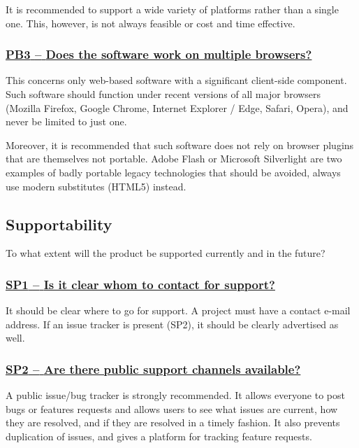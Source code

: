 \documentclass[a4paper,11pt]{article}
\newcommand{\indicator}[1]{\subsubsection*{\underline{#1}}}
\begin{document}
It is recommended to support a wide variety of platforms rather than a single
one. This, however, is not always feasible or cost and time effective.

\newcommand{\pbThreeName}{PB3}
\newcommand{\pbThreeID}{\pbThreeName}
\newcommand{\pbThreeText}{Does the software work on multiple browsers?}
\indicator{\pbThreeName{ }--{ }\pbThreeText}\label{id:pb3} 

This concerns only web-based software with a significant client-side component.
Such software should function under recent versions of all major browsers
(Mozilla Firefox, Google Chrome, Internet Explorer / Edge, Safari, Opera), and
never be limited to just one.

Moreover, it is recommended that such software does not rely on browser plugins that
are themselves not portable. Adobe Flash or Microsoft Silverlight are two
examples of badly portable legacy technologies that should be avoided, always use
modern substitutes (HTML5) instead.

\subsection{Supportability}\label{sec:sup}

To what extent will the product be supported currently and in the future?

\newcommand{\spOneName}{SP1}
\newcommand{\spOneID}{\spOneName}
\newcommand{\spOneText}{Is it clear whom to contact for support?}
\indicator{\spOneName{ }--{ }\spOneText}\label{id:sp1} 

It should be clear where to go for support. A project must have a contact
e-mail address. If an issue tracker is present (SP2), it should be clearly advertised
as well.

\newcommand{\spTwoName}{SP2}
\newcommand{\spTwoID}{\spTwoName}
\newcommand{\spTwoText}{Are there public support channels available?}
\indicator{\spTwoName{ }--{ }\spTwoText}\label{id:sp2} 

A public issue/bug tracker is strongly recommended. It allows everyone to post
bugs or features requests and allows users to see what issues are current, how
they are resolved, and if they are resolved in a timely fashion. It also
prevents duplication of issues, and gives a platform for
tracking feature requests.
\end{document}

